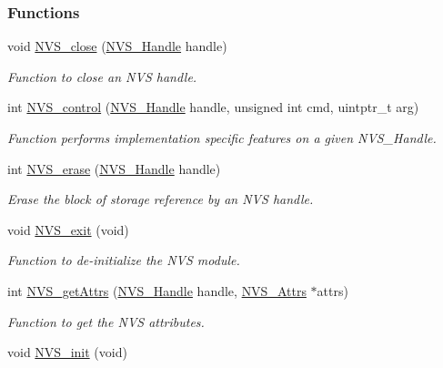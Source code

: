 \subsubsection*{Functions}
\begin{DoxyCompactItemize}
\item 
void \hyperlink{_n_v_s_8h_a12147fcc41f532802d97c0784c3e30c3}{N\+V\+S\+\_\+close} (\hyperlink{_n_v_s_8h_a1ee0bd7b3cd443236454a8cb1f56ad44}{N\+V\+S\+\_\+\+Handle} handle)
\begin{DoxyCompactList}\small\item\em Function to close an N\+V\+S handle. \end{DoxyCompactList}\item 
int \hyperlink{_n_v_s_8h_adb26bd05e4f063191411ac5ad968b1d9}{N\+V\+S\+\_\+control} (\hyperlink{_n_v_s_8h_a1ee0bd7b3cd443236454a8cb1f56ad44}{N\+V\+S\+\_\+\+Handle} handle, unsigned int cmd, uintptr\+\_\+t arg)
\begin{DoxyCompactList}\small\item\em Function performs implementation specific features on a given N\+V\+S\+\_\+\+Handle. \end{DoxyCompactList}\item 
int \hyperlink{_n_v_s_8h_af541d0cf115b8de4168eef31133364dc}{N\+V\+S\+\_\+erase} (\hyperlink{_n_v_s_8h_a1ee0bd7b3cd443236454a8cb1f56ad44}{N\+V\+S\+\_\+\+Handle} handle)
\begin{DoxyCompactList}\small\item\em Erase the block of storage reference by an N\+V\+S handle. \end{DoxyCompactList}\item 
void \hyperlink{_n_v_s_8h_aa72b8cbb46bfc2a9e61102144a58b554}{N\+V\+S\+\_\+exit} (void)
\begin{DoxyCompactList}\small\item\em Function to de-\/initialize the N\+V\+S module. \end{DoxyCompactList}\item 
int \hyperlink{_n_v_s_8h_a6b92f45097f377824524f7a4f33f02b1}{N\+V\+S\+\_\+get\+Attrs} (\hyperlink{_n_v_s_8h_a1ee0bd7b3cd443236454a8cb1f56ad44}{N\+V\+S\+\_\+\+Handle} handle, \hyperlink{struct_n_v_s___attrs}{N\+V\+S\+\_\+\+Attrs} $\ast$attrs)
\begin{DoxyCompactList}\small\item\em Function to get the N\+V\+S attributes. \end{DoxyCompactList}\item 
void \hyperlink{_n_v_s_8h_a94e249f718eba502cdf34d098c83209e}{N\+V\+S\+\_\+init} (void)

\end{DoxyCompactItemize}
